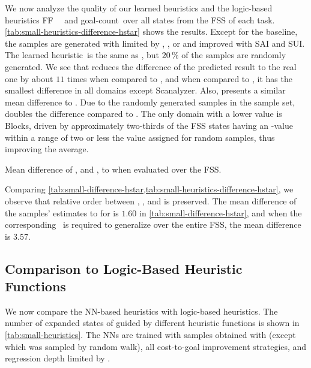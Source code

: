 We now analyze the quality of our learned heuristics and the logic-based heuristics FF~\hff~\cite{hoffmann2001ff} and goal-count~\hgc over all states from the FSS of each task. \cref{tab:small-heuristics-difference-hstar} shows the results. Except for the baseline, the samples are generated with \bfsrw limited by \rldefault, \rlfacts, or \rlmeanfx and improved with SAI and SUI. The learned heuristic~\hnnrs is the same as \hnnl{\rlmeanfx}, but $20\,\%$ of the samples are randomly generated. We see that \hnnl{\rlmeanfx} reduces the difference of the predicted result to the real one by about $11$ times when compared to \hnnbase, and when compared to \hgc, it has the smallest difference in all domains except Scanalyzer. Also, \hnnl{\rlmeanfx} presents a similar mean difference to \hff. Due to the randomly generated samples in the sample set, \hnnrs doubles the difference compared to \hnnl{\rlmeanfx}. The only domain with a lower value is Blocks, driven by approximately two-thirds of the FSS states having an \hstar-value within a range of two or less the value assigned for random samples, thus improving the average.

\begin{table}[tb]
    \caption[Mean difference of heuristics to \hstar when evaluated over the FSS.]{Mean difference of \hff, \hgc and \hnn, to \hstar when evaluated over the FSS.}
    \label{tab:small-heuristics-difference-hstar}
    \addmargin
    \centering
    
\end{table}

Comparing \cref{tab:small-difference-hstar,tab:small-heuristics-difference-hstar}, we observe that relative order between \rldefault, \rlfacts, and \rlmeanfx is preserved. The mean difference of the samples' estimates to \hstar for \rlmeanfx is $1.60$ in \cref{tab:small-difference-hstar}, and when the corresponding~\hnnl{\rlmeanfx} is required to generalize over the entire FSS, the mean difference is $3.57$.

\subsection{Comparison to Logic-Based Heuristic Functions}
\label{sec:small-exps-hvalue-comparison}

We now compare the NN-based heuristics with logic-based heuristics. The number of expanded states of \gbfs guided by different heuristic functions is shown in \cref{tab:small-heuristics}. The NNs are trained with samples obtained with \bfsrw (except \hnnrwrs which was sampled by random walk), all cost-to-goal improvement strategies, and regression depth limited by \rlmeanfx.  

